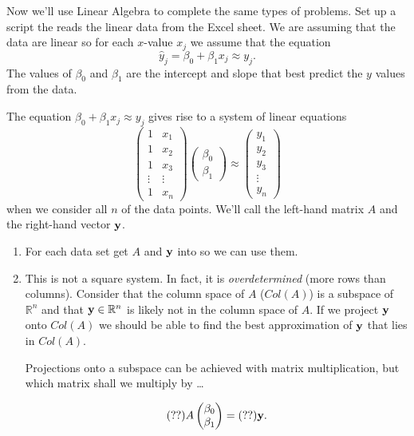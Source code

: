 \begin{problem}
    Now we'll use Linear Algebra to complete the same types of problems.  Set up a
    \ProgLang script the reads the linear data from the Excel sheet.  We are
    assuming that the data are linear so for each $x$-value $x_j$ we assume that the equation 
    \[ \hat{y}_j =  \beta_0 + \beta_1 x_j \approx y_j. \]
    The values of $\beta_0$ and $\beta_1$ are the intercept and slope that best predict
    the $y$ values from the data.

    The equation $\beta_0 + \beta_1 x_j \approx y_j$ gives rise to a system of linear equations
    \[ \begin{pmatrix} 1 & x_1 \\ 1 & x_2 \\ 1 & x_3 \\ \vdots & \vdots \\ 1 & x_n
        \end{pmatrix} \begin{pmatrix} \beta_0 \\ \beta_1 \end{pmatrix} \approx \begin{pmatrix} y_1
            \\ y_2 \\ y_3 \\ \vdots \\ y_n \end{pmatrix} \]
    when we consider all $n$ of the data points.
    We'll call the left-hand matrix $A$ and the right-hand vector ${\bf y}$.  
    \begin{enumerate}
        \item For each data set get $A$ and ${\bf y}$ into \ProgLang so we can use them.
        \item This is not a square system. In fact, it is {\it overdetermined} (more rows
            than columns).  Consider
            that the column space of $A$ ($Col(A)$) is a subspace of $\mathbb{R}^n$ and
            that ${\bf y} \in \mathbb{R}^n$ is likely not in the column space of $A$.  If we
            project ${\bf y}$ onto $Col(A)$ we should be able to find the best approximation
            of ${\bf y}$ that lies in $Col(A)$. 

            Projections onto a subspace can be achieved with matrix multiplication, but
            which matrix shall we multiply by \dots

            \[ (??) A \begin{pmatrix} \beta_0 \\ \beta_1 \end{pmatrix}  = (??) {\bf y}. \]


\end{enumerate}
\end{problem}
